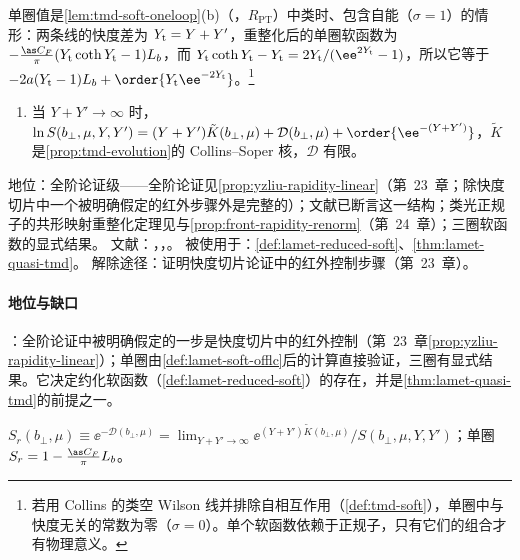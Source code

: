 单圈值是\cref{lem:tmd-soft-oneloop}(b)（\tagR，$R_{\mathrm{PT}}$）中类时、包含自能（$\sigma=1$）的情形：两条线的快度差为 $Y_{\rm t}=Y+Y'$，重整化后的单圈软函数为 $-\frac{\as C_F}\pi(Y_{\rm t}\coth Y_{\rm t}-1)L_b$，而 $Y_{\rm t}\coth Y_{\rm t}-Y_{\rm t}=2Y_{\rm t}/(\ee^{2Y_{\rm t}}-1)$，所以它等于 $-2a(Y_{\rm t}-1)L_b+\order{Y_{\rm t}\ee^{-2Y_{\rm t}}}$。\footnote{若用 Collins 的类空 Wilson 线并排除自相互作用（\cref{def:tmd-soft}），单圈中与快度无关的常数为零（$\sigma=0$）。单个软函数依赖于正规子，只有它们的组合才有物理意义。}

\begin{assumption}\label{asm:lamet-soft-rapidity}
\begin{enumerate}[label=(SR),leftmargin=3.2em,itemsep=1pt,topsep=2pt]
\item 当 $Y+Y'\to\infty$ 时，$\ln S(b_\perp,\mu,Y,Y')=(Y+Y')\tilde K(b_\perp,\mu)+\mathcal D(b_\perp,\mu)+\order{\ee^{-(Y+Y')}}$，$\tilde K$ 是\cref{prop:tmd-evolution}的 Collins--Soper 核，$\mathcal D$ 有限。
\end{enumerate}
地位：全阶论证级——全阶论证见\cref{prop:yzliu-rapidity-linear}（第~23~章；除快度切片中一个被明确假定的红外步骤外是完整的）；文献\cite{CollinsSoper1981}已断言这一结构；类光正规子的共形映射重整化定理见\cite{Vladimirov:2017ksc}与\cref{prop:front-rapidity-renorm}（第~24~章）；三圈软函数的显式结果\cite{Li:2016axz}。
文献：\cite{Ji:2019sxk}，\cite[附录~E]{Liu:2022nnk}，\cite{CollinsSoper1981,Vladimirov:2017ksc,Li:2016axz}。
被使用于：\cref{def:lamet-reduced-soft}、\cref{thm:lamet-quasi-tmd}。
解除途径：证明快度切片论证中的红外控制步骤（第~23~章）。
\end{assumption}

\paragraph{地位与缺口}
\tagA：全阶论证中被明确假定的一步是快度切片中的红外控制（第~23~章\cref{prop:yzliu-rapidity-linear}）；单圈由\cref{def:lamet-soft-offlc}后的计算直接验证，三圈有显式结果\cite{Li:2016axz}。它决定约化软函数（\cref{def:lamet-reduced-soft}）的存在，并是\cref{thm:lamet-quasi-tmd}的前提之一。

\begin{definition}[约化软函数 $S_r$]\label{def:lamet-reduced-soft}
$S_r(b_\perp,\mu)\equiv\ee^{-\mathcal D(b_\perp,\mu)}=\lim_{Y+Y'\to\infty}\ee^{(Y+Y')\tilde K(b_\perp,\mu)}/S(b_\perp,\mu,Y,Y')$；单圈 $S_r=1-\frac{\as C_F}\pi L_b$。%
\end{definition}

